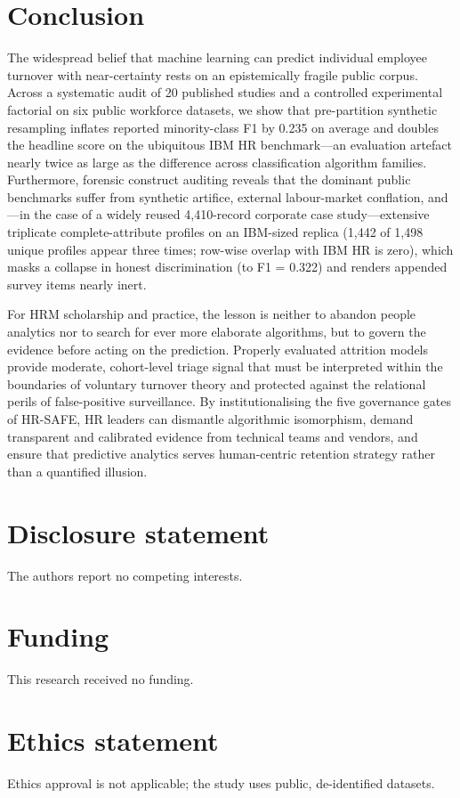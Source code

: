 \documentclass[12pt,a4paper]{article}
\begin{document}
\section{Conclusion}
The widespread belief that machine learning can predict individual employee turnover with near-certainty rests on an epistemically fragile public corpus. Across a systematic audit of 20 published studies and a controlled experimental factorial on six public workforce datasets, we show that pre-partition synthetic resampling inflates reported minority-class F1 by 0.235 on average and doubles the headline score on the ubiquitous IBM HR benchmark---an evaluation artefact nearly twice as large as the difference across classification algorithm families. Furthermore, forensic construct auditing reveals that the dominant public benchmarks suffer from synthetic artifice, external labour-market conflation, and---in the case of a widely reused 4,410-record corporate case study---extensive triplicate complete-attribute profiles on an IBM-sized replica (1,442 of 1,498 unique profiles appear three times; row-wise overlap with IBM HR is zero), which masks a collapse in honest discrimination (to F1 = 0.322) and renders appended survey items nearly inert.

For HRM scholarship and practice, the lesson is neither to abandon people analytics nor to search for ever more elaborate algorithms, but to govern the evidence before acting on the prediction. Properly evaluated attrition models provide moderate, cohort-level triage signal that must be interpreted within the boundaries of voluntary turnover theory and protected against the relational perils of false-positive surveillance. By institutionalising the five governance gates of HR-SAFE, HR leaders can dismantle algorithmic isomorphism, demand transparent and calibrated evidence from technical teams and vendors, and ensure that predictive analytics serves human-centric retention strategy rather than a quantified illusion.

\section*{Disclosure statement}
The authors report no competing interests.

\section*{Funding}
This research received no funding.

\section*{Ethics statement}
Ethics approval is not applicable; the study uses public, de-identified datasets.
\end{document}

